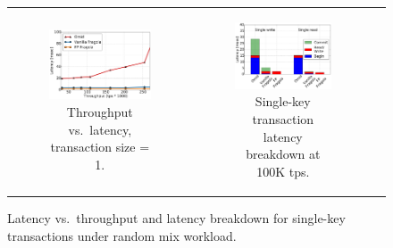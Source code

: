 \begin{figure}[hbt]
\centering
\begin{tabular}{ccc}
      \begin{subfigure}[t]{0.48\textwidth}
      	\includegraphics[width=\textwidth]{figs/throughputlatency1.pdf}
	    \caption{Throughput vs.\ latency, transaction size = 1.}
        \label{fig:tl-1}      
      \end{subfigure} 
    
& 
      \begin{subfigure}[t]{0.48\textwidth}
      	\includegraphics[width=\textwidth]{figs/latency_PUTGET.pdf}
        \caption[]{Single-key transaction latency breakdown at 100K tps.}
        \label{fig:stack-brc}
      \end{subfigure}  & 

\end{tabular}
       \caption{Latency vs.\ throughput and latency breakdown  for single-key transactions under  random mix workload. }
\end{figure}

